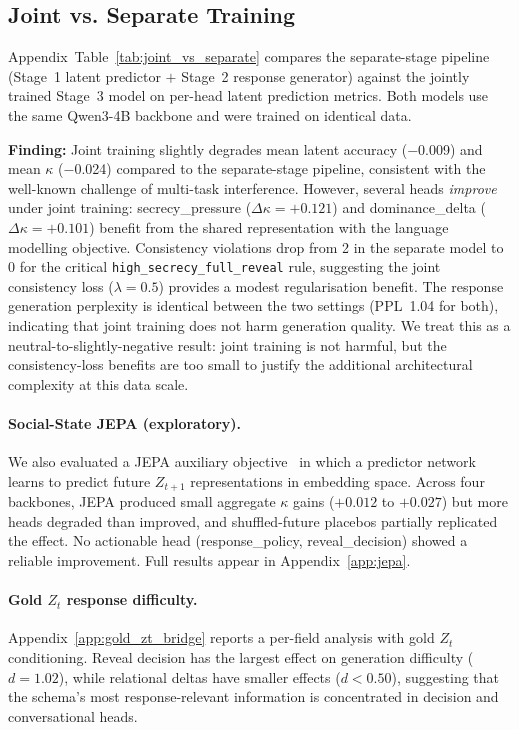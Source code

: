 \documentclass[11pt]{article}
\begin{document}
\subsection{Joint vs. Separate Training}
\label{sec:joint_vs_separate}

Appendix~Table~\ref{tab:joint_vs_separate} compares the separate-stage pipeline (Stage~1 latent predictor $+$ Stage~2 response generator) against the jointly trained Stage~3 model on per-head latent prediction metrics.
Both models use the same Qwen3-4B backbone and were trained on identical data.

\textbf{Finding:} Joint training slightly degrades mean latent accuracy ($-$0.009) and mean $\kappa$ ($-$0.024) compared to the separate-stage pipeline, consistent with the well-known challenge of multi-task interference.
However, several heads \textit{improve} under joint training: secrecy\_pressure ($\Delta\kappa{=}+0.121$) and dominance\_delta ($\Delta\kappa{=}+0.101$) benefit from the shared representation with the language modelling objective.
Consistency violations drop from 2 in the separate model to 0 for the critical \texttt{high\_secrecy\_full\_reveal} rule, suggesting the joint consistency loss ($\lambda{=}0.5$) provides a modest regularisation benefit.
The response generation perplexity is identical between the two settings (PPL~1.04 for both), indicating that joint training does not harm generation quality.
We treat this as a neutral-to-slightly-negative result: joint training is not harmful, but the consistency-loss benefits are too small to justify the additional architectural complexity at this data scale.

\paragraph{Social-State JEPA (exploratory).}
We also evaluated a JEPA auxiliary objective~\cite{lecun2022path,assran2023self} in which a predictor network learns to predict future $Z_{t+1}$ representations in embedding space.
Across four backbones, JEPA produced small aggregate $\kappa$ gains ($+0.012$ to $+0.027$) but more heads degraded than improved, and shuffled-future placebos partially replicated the effect.
No actionable head (response\_policy, reveal\_decision) showed a reliable improvement.
Full results appear in Appendix~\ref{app:jepa}.

\paragraph{Gold $Z_t$ response difficulty.}
Appendix~\ref{app:gold_zt_bridge} reports a per-field analysis with gold $Z_t$ conditioning.
Reveal decision has the largest effect on generation difficulty ($d{=}1.02$), while relational deltas have smaller effects ($d{<}0.50$), suggesting that the schema's most response-relevant information is concentrated in decision and conversational heads.
\end{document}
